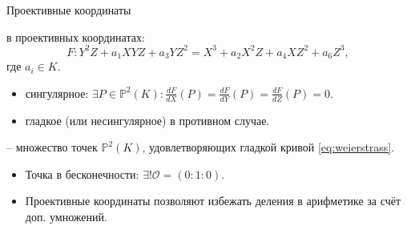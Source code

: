 \documentclass{beamer}
\begin{document}
\begin{frame}{Проективные координаты}
    
     в проективных координатах: 
        \begin{equation}
            \label{eq:weierstrass}
            F: Y^2Z + a_1 X Y Z + a_3 Y Z^2 = X^3 + a_2 X^2 Z + a_4 X Z^2 + a_6 Z^3,
        \end{equation}
        где $a_i \in K$.
        \begin{itemize}
            \item \textcolor{struct-color}{сингулярное}: $\exists P \in \mathbb{P}^2(K): \frac{dF}{dX}(P) = \frac{dF}{dY}(P) = \frac{dF}{dZ}(P) = 0$.
            \item  \textcolor{struct-color}{гладкое} (или несингулярное) в противном случае.
        \end{itemize}
    
    \vspace{1em}
    
     -- множество точек $\mathbb{P}^2(K)$, удовлетворяющих гладкой кривой \eqref{eq:weierstrass}.
        
    \begin{itemize}
        \item Точка в бесконечности: $\exists! \mathcal{O} = (0: 1: 0)$.
    \end{itemize}

	\begin{itemize}
	\item Проективные координаты позволяют избежать деления в арифметике за счёт доп. умножений.
\end{itemize}
\end{frame}
\end{document}
